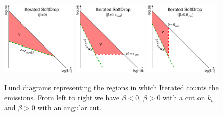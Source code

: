 \begin{figure}
    \centering
    \includegraphics[width=0.32\textwidth]{figures/Lund-ISD-negb.pdf}%
    \hfill%
    \includegraphics[width=0.32\textwidth]{figures/Lund-ISD-posb-ktcut.pdf}%
    \hfill%
    \includegraphics[width=0.32\textwidth]{figures/Lund-ISD-posb-thetacut.pdf}
    \caption{Lund diagrams representing the regions in which Iterated
      \SD counts the emissions. From left to right we have $\beta<0$,
      $\beta>0$ with a cut on $k_t$ and $\beta>0$ with an angular cut.
    }\label{fig:lund-isd-lund}
\end{figure}

